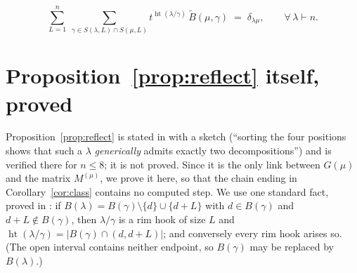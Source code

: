 \documentclass[11pt]{article}
\theoremstyle{definition}
\newcommand{\hgt}{\operatorname{ht}}
\newcommand{\wtB}{\widetilde{B}}
\begin{document}
\begin{equation}\label{eq:local}
  \sum_{L=1}^{n}\ \sum_{\gamma\in S(\lambda,L)\cap S(\mu,L)}
     t^{\hgt(\lambda/\gamma)}\,\wtB(\mu,\gamma)\;=\;\delta_{\lambda\mu},
  \qquad \forall\,\lambda\vdash n .
\end{equation}

\section{Proposition~\ref{prop:reflect} itself, proved}\label{sec:reflect}

Proposition~\ref{prop:reflect} is stated in \cite{Q140} with a sketch (``sorting the four
positions shows that such a $\lambda$ \emph{generically} admits exactly two decompositions'')
and is verified there for $n\le8$; it is not proved. Since it is the only link between
$G(\mu)$ and the matrix $M^{(\mu)}$, we prove it here, so that the chain ending in
Corollary~\ref{cor:class} contains no computed step. We use one standard fact, proved in
\cite[Prop.~2.1]{Q140}: if $B(\lambda)=B(\gamma)\setminus\{d\}\cup\{d+L\}$ with $d\in B(\gamma)$
and $d+L\notin B(\gamma)$, then $\lambda/\gamma$ is a rim hook of size $L$ and
$\hgt(\lambda/\gamma)=|B(\gamma)\cap(d,d+L)|$; and conversely every rim hook arises so.
(The open interval contains neither endpoint, so $B(\gamma)$ may be replaced by $B(\lambda)$.)
\end{document}
